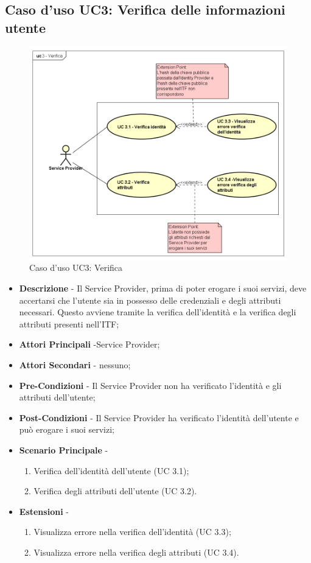 \subsection{Caso d'uso UC3: Verifica delle informazioni utente}
\begin{figure}[h]
	\centering
	\includegraphics[scale=0.50]{immagini/usecase/UC3_Verifica}
	\caption{Caso d'uso UC3: Verifica}
\end{figure}
\begin{itemize}
	\item \textbf{Descrizione} - Il Service Provider, prima di poter erogare i suoi servizi, deve accertarsi che l'utente sia in possesso delle credenziali e degli attributi necessari. Questo avviene tramite la verifica dell'identità e la verifica degli attributi presenti nell'\gls{ITF};
	\item \textbf{Attori Principali} -Service Provider;
	\item \textbf{Attori Secondari} - nessuno;
	\item \textbf{Pre-Condizioni} - Il Service Provider non ha verificato l'identità e gli attributi dell'utente;
	\item \textbf{Post-Condizioni} - Il Service Provider ha verificato l'identità dell'utente e può erogare i suoi servizi;
	\item \textbf{Scenario Principale} -
	\begin{enumerate}
		\item Verifica dell'identità dell'utente (UC 3.1);
		\item Verifica degli attributi dell'utente (UC 3.2).
	\end{enumerate}
	\item \textbf{Estensioni} -
	\begin{enumerate}
		\item Visualizza errore nella verifica dell'identità (UC 3.3);
		\item Visualizza errore nella verifica degli attributi (UC 3.4).
	\end{enumerate}
\end{itemize}
